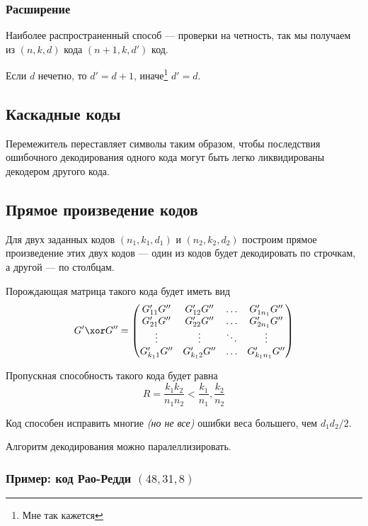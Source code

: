 \subsubsection{Расширение}

Наиболее распространенный способ --- проверки на четность,
так мы получаем из \((n,k,d)\) кода \((n + 1, k, d')\) код.

Если \(d\) нечетно, то \(d' = d + 1\), иначе\footnote{Мне так кажется} \(d' = d\).

\subsection{Каскадные коды}

Перемежитель переставляет символы таким образом,
чтобы последствия ошибочного декодирования одного кода могут быть легко ликвидированы декодером другого кода.

\subsection{Прямое произведение кодов}

Для двух заданных кодов \((n_1, k_1, d_1)\) и \((n_2, k_2, d_2)\)
построим прямое произведение этих двух кодов
--- один из кодов будет декодировать по строчкам, а другой --- по столбцам.

Порождающая матрица такого кода будет иметь вид
\[G' \xor G'' = \begin{pmatrix}
    G_{11}' G'' & G_{12}' G'' & \ldots & G_{1n_1}' G'' \\
    G_{21}' G'' & G_{22}' G'' & \ldots & G_{2n_1}' G'' \\
    \vdots & \vdots & \ddots & \vdots \\
    G_{k_1 1}' G'' & G_{k_1 2}' G'' & \ldots & G_{k_1n_1}' G''
\end{pmatrix}\]

Пропускная способность такого кода будет равна
\[R = \frac{k_1k_2}{n_1n_2} < \frac{k_1}{n_1}, \frac{k_2}{n_2}\]

Код способен исправить многие \textit{(но не все)} ошибки веса большего,
чем \(d_1d_2 / 2\).

Алгоритм декодирования можно паралеллизировать.

\subsubsection{Пример: код Рао-Редди \((48,31,8)\)}

